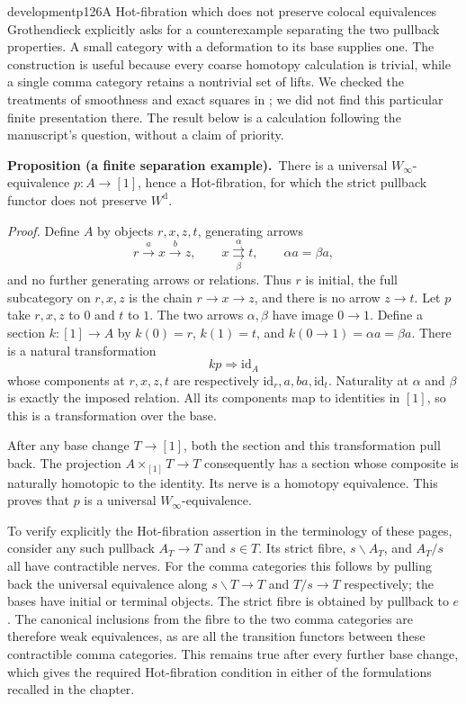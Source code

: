 \begin{dcomment}{development}{p126}{A Hot-fibration which does not preserve colocal equivalences}
Grothendieck explicitly asks for a counterexample separating the two pullback properties. A small category with a deformation to its base supplies one. The construction is useful because every coarse homotopy calculation is trivial, while a single comma category retains a nontrivial set of lifts. We checked the treatments of smoothness and exact squares in \citet{Maltsiniotis2005Asphericite,Maltsiniotis2012Exact}; we did not find this particular finite presentation there. The result below is a calculation following the manuscript's question, without a claim of priority.

\textbf{Proposition (a finite separation example).}\ours\
There is a universal $W_\infty$-equivalence $p:A\to[1]$, hence a Hot-fibration, for which the strict pullback functor does not preserve $W^{\mathrm d}$.

\textit{Proof.} Define $A$ by objects $r,x,z,t$, generating arrows
\[
 r\xrightarrow{a}x\xrightarrow{b}z,
 \qquad x\overset{\alpha}{\underset{\beta}{\rightrightarrows}}t,
 \qquad \alpha a=\beta a,
\]
and no further generating arrows or relations. Thus $r$ is initial, the full subcategory on $r,x,z$ is the chain $r\to x\to z$, and there is no arrow $z\to t$. Let $p$ take $r,x,z$ to $0$ and $t$ to $1$. The two arrows $\alpha,\beta$ have image $0\to1$. Define a section $k:[1]\to A$ by $k(0)=r$, $k(1)=t$, and $k(0\to1)=\alpha a=\beta a$. There is a natural transformation
\[
 kp\Longrightarrow\mathrm{id}_A
\]
whose components at $r,x,z,t$ are respectively $\mathrm{id}_r,a,ba,\mathrm{id}_t$. Naturality at $\alpha$ and $\beta$ is exactly the imposed relation. All its components map to identities in $[1]$, so this is a transformation over the base.

After any base change $T\to[1]$, both the section and this transformation pull back. The projection $A\times_{[1]}T\to T$ consequently has a section whose composite is naturally homotopic to the identity. Its nerve is a homotopy equivalence. This proves that $p$ is a universal $W_\infty$-equivalence.

To verify explicitly the Hot-fibration assertion in the terminology of these pages, consider any such pullback $A_T\to T$ and $s\in T$. Its strict fibre, $s\backslash A_T$, and $A_T/s$ all have contractible nerves. For the comma categories this follows by pulling back the universal equivalence along $s\backslash T\to T$ and $T/s\to T$ respectively; the bases have initial or terminal objects. The strict fibre is obtained by pullback to $e$. The canonical inclusions from the fibre to the two comma categories are therefore weak equivalences, as are all the transition functors between these contractible comma categories. This remains true after every further base change, which gives the required Hot-fibration condition in either of the formulations recalled in the chapter.


\end{dcomment}
